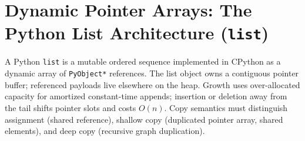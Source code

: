 \section{Dynamic Pointer Arrays: The Python List Architecture (\texttt{list})}

A Python \texttt{list} is a mutable ordered sequence implemented in CPython as a dynamic array of \texttt{PyObject*} references. The list object owns a contiguous pointer buffer; referenced payloads live elsewhere on the heap. Growth uses over-allocated capacity for amortized constant-time appends; insertion or deletion away from the tail shifts pointer slots and costs $O(n)$. Copy semantics must distinguish assignment (shared reference), shallow copy (duplicated pointer array, shared elements), and deep copy (recursive graph duplication).
